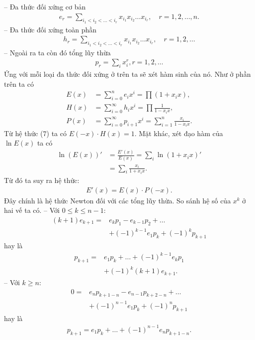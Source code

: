 \begin{multicols}{2}
	-- Đa thức đối xứng cơ bản
	\begin{align*}
		e_r=\sum_{i_1<i_2<\ldots<i_r}x_{i_1}x_{i_2}\ldots x_{i_r},\quad r=1,2,\ldots, n.
	\end{align*}
	-- Đa thức đối xứng toàn phần
	\begin{align*}
		h _r=\sum_{i_1<i_2<\ldots<i_r}x_{i_1}x_{i_2}\ldots x_{i_r},\quad r=1,2,\ldots
	\end{align*}
	-- Ngoài ra ta còn đó tổng lũy thừa 
	\begin{align*}
		p_r=\sum_i x_i^r, r=1,2,\ldots
	\end{align*}
	Ứng với mỗi loại đa thức đối xứng ở trên ta sẽ xét hàm sinh của nó. Như ở phần trên ta có
	\begin{align*}
		E(x)&=\sum_{i=0}^n e_ix^i=\prod(1+x_ix),\\
		H(x)&=\sum_{i=0}^\infty h_i x^i=\prod\frac1{1-x_i x},\\
		P(x)&= \sum_{i=0}^\infty p_{i+1} x^{i}=\sum_{i=1}^n \frac {x_i}{1-x_i x}.
	\end{align*}	
	Từ hệ thức ($7$) ta có  $E(-x)\cdot H(x)=1$.
	\vskip 0.1cm
	Mặt khác, xét đạo hàm của $\ln E(x)$ ta có
	\begin{align*}
		\ln(E(x))'&=\frac{E'(x)}{E(x)}= \sum_i\ln\left({1+x_i x}\right)'\\
		&=\sum_i\frac{x_i}{1+x_i x}.
	\end{align*}
	Từ đó ta suy ra hệ thức:
	\begin{align*}
		E'(x)=E(x)\cdot P(-x).
	\end{align*}
	Đây chính là {\color{blue} hệ thức Newton} đối với các tổng lũy thừa.   
	So sánh hệ số của $x^{k}$ ở hai vế ta có.
	\vskip 0.1cm
	-- Với $0\leq k\leq n-1$:
	\begin{align*}
		(k+1)e_{k+1}=&e_kp_1-e_{k-1}p_2+\ldots\\
		&+(-1)^{k-1} e_1p_k+(-1)^{k}p_{k+1}
	\end{align*}
	hay là 
	\begin{align*}
		p_{k+1}=&e_1p_k+\ldots+(-1)^{k-1}e_kp_1\\
		&+(-1)^{k}(k+1)e_{k+1}.
	\end{align*}
	-- Với $k\geq n$:
	\begin{align*}
		0=&e_np_{k+1-n}-e_{n-1}p_{k+2-n}+\ldots\\
		&+(-1)^{n-1} e_1p_k+(-1)^{n}p_{k+1}
	\end{align*}
	hay là 
	\begin{align*}
		p_{k+1}=e_1p_k+\ldots+(-1)^{n-1}e_np_{k+1-n}.
	\end{align*}

\end{multicols}
